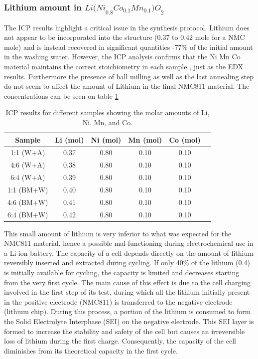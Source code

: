\documentclass{article}
\begin{document}
\subsubsection{Lithium amount in  \({Li(Ni}_{0.8}{Co}_{0.1}{Mn}_{0.1}{)O}_{2}\)}
The ICP results highlight a critical issue in the synthesis protocol.
 Lithium does not appear to be incorporated into the structure (0.37 to 0.42 mole for a NMC mole) 
and is instead recovered in significant quantities -77\% of the initial amount in the washing water.
 However, the ICP analysis confirms that the Ni Mn Co material maintains the correct stoichiometry in each sample
, just as the EDX results. Furthermore the presence of ball milling as well as the last
 annealing step do not seem to affect the amount of Lithium in the final NMC811 material. The concentrations can be seen
 on table \ref{ICP_results} \\
\begin{table}[H]
  \centering
  \begin{tabular}{|c|c|c|c|c|c|}
    \hline
    \textbf{Sample} & \textbf{Li (mol)} & \textbf{Ni (mol)} & \textbf{Mn (mol)} & \textbf{Co (mol)} \\
    \hline
    1:1 (W+A) & 0.37 & 0.80 & 0.10 & 0.10  \\
    \hline
    4:6 (W+A) & 0.38 & 0.80 & 0.10 & 0.10 \\
    \hline
    6:4 (W+A) & 0.39 & 0.80 & 0.10 & 0.10 \\
    \hline
    1:1 (BM+W) & 0.40 & 0.80 & 0.10 & 0.10  \\
    \hline
    4:6 (BM+W) & 0.41 & 0.80 & 0.10 & 0.10  \\
    \hline
    6:4 (BM+W) & 0.42 & 0.80 & 0.10 & 0.10  \\
    \hline
  \end{tabular}
  \caption{ICP results for different samples showing the molar amounts of Li, Ni, Mn, and Co.}
  \label{ICP_results}
\end{table}
This small amount of lithium is very inferior to what was expected for the NMC811 material, hence a possible mal-functioning during electrochemical use in a Li-ion battery. 
The capacity of a cell depends directly on the amount of lithium reversibly inserted and extracted during cycling. 
If only 40\% of the lithium (0.4) is initially available  for cycling, the capacity is limited and decreases starting from
 the very first cycle. The main cause of this effect is due to the cell charging involved in the first step of its test,
 during which all the lithium initially present in the positive electrode (NMC811) is transferred to the negative electrode
 (lithium chip). During this process, a portion of the lithium is consumed to form the Solid Electrolyte Interphase (SEI)
 on the negative electrode. This SEI layer is formed to increase the stability and safety of the cell but causes an irreversible
 loss of lithium during the first charge. Consequently, the capacity of the cell diminishes from its theoretical capacity in the
 first cycle.\cite{capacity}\\
\end{document}
